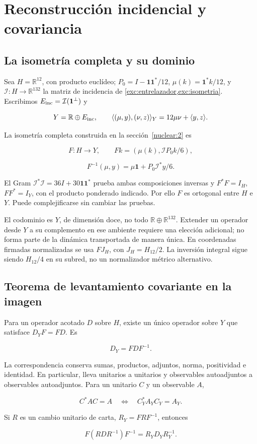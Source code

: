 \section{Reconstrucción incidencial y covariancia}
\label{nuclear:5}
\subsection{La isometría completa y su dominio}\label{nuc05:isometria}

Sea \(H=\mathbb R^{12}\), con producto euclídeo; \(P_0=I-\mathbf1\mathbf1^*/12\), \(\mu(k)=\mathbf1^*k/12\), y \(\mathcal I:H\to\mathbb R^{132}\) la matriz de incidencia de \cref{exc:entrelazador,exc:isometria}. Escribimos \(E_{\rm inc}=\mathcal I(\mathbf1^\perp)\) y

\[
Y=\mathbb R\oplus E_{\rm inc},\qquad
\langle(\mu,y),(\nu,z)\rangle_Y=12\mu\nu+\langle y,z\rangle.
\]

La isometría completa construida en la sección~\ref{nuclear:2} es

\[
F:H\longrightarrow Y,\qquad Fk=(\mu(k),\mathcal I P_0k/6),
\]

\[
F^{-1}(\mu,y)=\mu\mathbf1+P_0\mathcal I^*y/6.
\]

El Gram \(\mathcal I^*\mathcal I=36I+30\mathbf1\mathbf1^*\) prueba ambas composiciones inversas y \(F^*F=I_H\), \(FF^*=I_Y\), con el producto ponderado indicado. Por ello \(F\) es ortogonal entre \(H\) e \(Y\). Puede complejificarse sin cambiar las pruebas.

El codominio es \(Y\), de dimensión doce, no todo \(\mathbb R\oplus\mathbb R^{132}\). Extender un operador desde \(Y\) a su complemento en ese ambiente requiere una elección adicional; no forma parte de la dinámica transportada de manera única. En coordenadas firmadas normalizadas se usa \(FJ_H\), con \(J_H=H_{12}/2\). La inversión integral sigue siendo \(H_{12}/4\) en su subred, no un normalizador métrico alternativo.

\subsection{Teorema de levantamiento covariante en la imagen}\label{nuc05:levantamiento}

\begin{theorem}
Para un operador acotado \(D\) sobre \(H\), existe un único operador sobre \(Y\) que satisface \(D_YF=FD\). Es

\[
D_Y=FDF^{-1}.
\]

La correspondencia conserva sumas, productos, adjuntos, norma, positividad e identidad. En particular, lleva unitarios a unitarios y observables autoadjuntos a observables autoadjuntos. Para un unitario \(C\) y un observable \(A\),

\[
C^*AC=A\quad\Longleftrightarrow\quad C_Y^*A_YC_Y=A_Y.
\]

Si \(R\) es un cambio unitario de carta, \(R_Y=FRF^{-1}\), entonces

\[
F(RDR^{-1})F^{-1}=R_YD_YR_Y^{-1}.
\]
\end{theorem}

